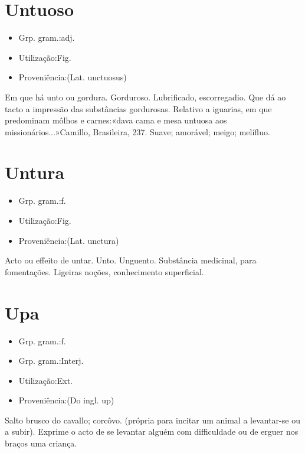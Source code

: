 \documentclass{article}
\begin{document}
\section{Untuoso}
\begin{itemize}
\item {Grp. gram.:adj.}
\end{itemize}
\begin{itemize}
\item {Utilização:Fig.}
\end{itemize}
\begin{itemize}
\item {Proveniência:(Lat. \textunderscore unctuosus\textunderscore )}
\end{itemize}
Em que há unto ou gordura.
Gorduroso.
Lubrificado, escorregadio.
Que dá ao tacto a impressão das substâncias gordurosas.
Relativo a iguarias, em que predominam môlhos e carnes:«\textunderscore dava cama e mesa untuosa aos missionários...\textunderscore »Camillo, \textunderscore Brasileira\textunderscore , 237.
Suave; amorável; meigo; melífluo.
\section{Untura}
\begin{itemize}
\item {Grp. gram.:f.}
\end{itemize}
\begin{itemize}
\item {Utilização:Fig.}
\end{itemize}
\begin{itemize}
\item {Proveniência:(Lat. \textunderscore unctura\textunderscore )}
\end{itemize}
Acto ou effeito de untar.
Unto.
Unguento.
Substância medicinal, para fomentações.
Ligeiras noções, conhecimento superficial.
\section{Upa}
\begin{itemize}
\item {Grp. gram.:f.}
\end{itemize}
\begin{itemize}
\item {Grp. gram.:Interj.}
\end{itemize}
\begin{itemize}
\item {Utilização:Ext.}
\end{itemize}
\begin{itemize}
\item {Proveniência:(Do ingl. \textunderscore up\textunderscore )}
\end{itemize}
Salto brusco do cavallo; corcôvo.
(própria para incitar um animal a levantar-se ou a subir).
Exprime o acto de se levantar alguém com difficuldade ou de erguer nos braços uma criança.
\end{document}
